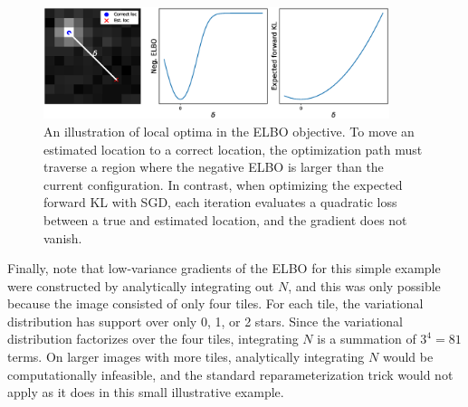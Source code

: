 \begin{figure}[!htb]
    \centering
    \includegraphics[width=0.9\textwidth]{figures_vg/elbo_vs_sleep/local_minima_cartoon.eps}
    \caption{An illustration of local optima in the ELBO objective.
    To move an estimated location to a correct location,
    the optimization path must traverse a region where the negative ELBO is larger than the current configuration.
    In contrast, when optimizing the expected forward KL with SGD, each iteration evaluates a
    quadratic loss between a true and estimated location,
    and the gradient does not vanish. }
    \label{fig:local_optima_cartoon}
\end{figure}

Finally, note that low-variance gradients of the ELBO for this simple example were constructed by analytically integrating out $N$, 
and this was only possible because the image consisted of only four tiles. 
For each tile, the variational distribution has support over only 0, 1, or 2 stars.
Since the variational distribution factorizes over the four tiles, integrating $N$ is a summation of $3^4 = 81$ terms.
On larger images with more tiles, analytically integrating $N$ would be computationally infeasible,
and the standard reparameterization trick would not apply as it does in this small illustrative example.




